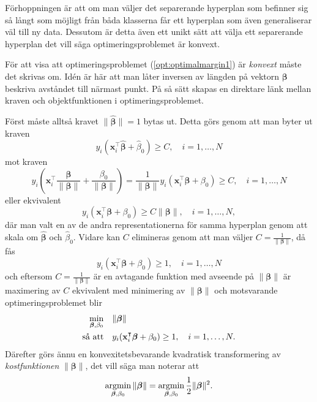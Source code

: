 \documentclass[a4paper, 12pt]{report}
\theoremstyle{definition}
\theoremstyle{remark}
\newcommand{\bfbeta}{{\boldsymbol{\beta}}}
\begin{document}
Förhoppningen är att om man väljer det separerande hyperplan som befinner sig så långt som möjligt från båda klasserna får ett hyperplan som även generaliserar väl till ny data. Dessutom är detta även ett unikt sätt att välja ett separerande hyperplan det vill säga optimeringsproblemet är konvext.

För att visa att optimeringsproblemet (\ref{opt:optimalmargin1}) är \textit{konvext} måste det skrivas om. Idén är här att man låter inversen av längden på vektorn $\bfbeta$ beskriva avståndet till närmast punkt. På så sätt skapas en direktare länk mellan kraven och objektfunktionen i optimeringsproblemet.

Först måste alltså kravet $\|\widehat{\bfbeta}\|=1$ bytas ut. Detta görs genom att man byter ut kraven
\begin{equation*}
y_i(\mathbf{x}_i^\intercal\widehat{\bfbeta}+\widehat{\beta}_0)\geq C,\quad i=1,\dots,N
\end{equation*}
mot kraven
\begin{equation*}
y_i\left(\mathbf{x}_i^\intercal\frac{\bfbeta}{\|\bfbeta\|}+\frac{\beta_0}{\|\bfbeta\|}\right) = 
\frac{1}{\|\bfbeta\|}y_i(\mathbf{x}_i^\intercal\bfbeta+\beta_0)
 \geq C,\quad i=1,\dots,N
\end{equation*}
eller ekvivalent
\begin{equation*}
y_i(\mathbf{x}_i^\intercal\bfbeta+\beta_0)\geq C\|\bfbeta\|,\quad i=1,\dots,N,
\end{equation*}
där man valt en av de andra representationerna för samma hyperplan genom att skala om $\widehat{\bfbeta}$ och $\widehat{\beta}_0$. Vidare kan $C$ elimineras genom att man väljer $C=\frac{1}{\|\bfbeta\|}$, då fås
\begin{equation*}
y_i(\mathbf{x}_i^\intercal\bfbeta+\beta_0)\geq 1,\quad i=1,\dots,N
\end{equation*}
och eftersom $C=\frac{1}{\|\bfbeta\|}$ är en avtagande funktion med avseende på $\|\bfbeta\|$ är maximering av $C$ ekvivalent med minimering av $\|\bfbeta\|$ och motsvarande optimeringsproblemet blir
\begin{equation*}%
\begin{aligned}
\operatornamewithlimits{min}_{\bfbeta,\beta_0} & & &\|\bfbeta\|\\
\text{så att} & & &y_i(\mathbf{x}_i^\intercal\bfbeta+\beta_0)\geq 1,\quad i=1,\dots,N.
\end{aligned}
\end{equation*}
Därefter görs ännu en konvexitetsbevarande kvadratisk transformering av \textit{kostfunktionen} $\|\bfbeta\|$, det vill säga man noterar att \begin{equation*}
\operatornamewithlimits{argmin}_{\bfbeta,\beta_0} \|\bfbeta\|=\operatornamewithlimits{argmin}_{\bfbeta,\beta_0} \frac{1}{2}\|\bfbeta\|^2.
\end{equation*}
\end{document}
